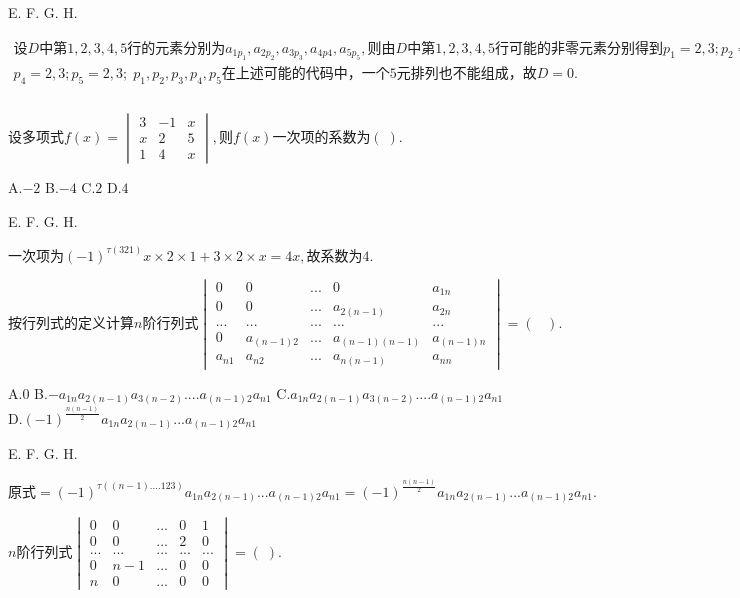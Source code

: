 E.   F.   G.   H.

$\begin{array}{l}设D\mathrm{中第}1,2,3,4,5\mathrm{行的元素分别为}a_{1p_1},a_{2p_2},a_{3p_3},a_{4p4},a_{5p_5},\mathrm{则由}D\mathrm{中第}1,2,3,4,5\mathrm{行可能的非零元素分别得到}p_1=2,3;p_2=1,2,3,4,5;p_3=1,2,3,4,5\\p_4=2,3;p_5=2,3;\;p_1,p_2,p_3,p_4,p_5\mathrm{在上述可能的代码中}，\mathrm{一个}5\mathrm{元排列也不能组成}，故D=0.\\\\\end{array}$


$\mathrm{设多项式}f(x)=\begin{vmatrix}3&-1&x\\x&2&5\\1&4&x\end{vmatrix},则f(x)\mathrm{一次项的系数为}(\;).$

A.$-2$   B.$-4$   C.$2$   D.$4$

E.   F.   G.   H.

$\mathrm{一次项为}(-1)^{\tau(321)}x\times2\times1+3\times2\times x=4x,\mathrm{故系数为}4.$


$\mathrm{按行列式的定义计算}n\mathrm{阶行列式}\begin{vmatrix}0&0&...&0&a_{1n}\\0&0&...&a_{2(n-1)}&a_{2n}\\...&...&...&...&...\\0&a_{(n-1)2}&...&a_{(n-1)(n-1)}&a_{(n-1)n}\\a_{n1}&a_{n2}&...&a_{n(n-1)}&a_{nn}\end{vmatrix}=(\;\;\;).$

A.$0$   B.$-a_{1n}a_{2(n-1)}a_{3(n-2)}....a_{(n-1)2}a_{n1}$   C.$a_{1n}a_{2(n-1)}a_{3(n-2)}....a_{(n-1)2}a_{n1}$   D.$(-1)^{\textstyle\frac{n(n-1)}2}{\textstyle{}^{}}a_{1n}a_{2(n-1)}...a_{(n-1)2}a_{n1}$

E.   F.   G.   H.

$\mathrm{原式}=(-1)^{\tau((n-1)....123)}a_{1n}a_{2(n-1)}...a_{(n-1)2}a_{n1}=(-1)^\frac{n(n-1)}2a_{1n}a_{2(n-1)}...a_{(n-1)2}a_{n1}.$


$n\mathrm{阶行列式}\begin{vmatrix}0&0&...&0&1\\0&0&...&2&0\\...&...&...&...&...\\0&n-1&...&0&0\\n&0&...&0&0\end{vmatrix}=(\;).$

